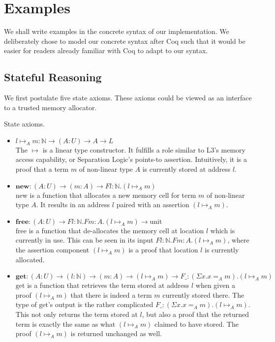 \documentclass[sigplan,screen,review,authordraft]{acmart}
\newcommand{\unit}{\text{unit}}
\newcommand{\new}{\text{new}}
\newcommand{\free}{\text{free}}
\newcommand{\get}{\text{get}}
\begin{document}
\section{Examples}
We shall write examples in the concrete syntax of our implementation. We deliberately chose to model our concrete syntax after Coq such that it would be easier for readers already familiar with Coq to adapt to our syntax.

\subsection{Stateful Reasoning}
We first postulate five state axioms. These axioms could be viewed as an interface to a trusted memory allocator.
\begin{definition}
  State axioms.
  \begin{itemize}
    \item $l \mapsto_A m : \mathbb{N} \rightarrow (A : U) \rightarrow A \rightarrow L$ \\
          The $\mapsto$ is a linear type constructor. It fulfills a role similar to L3's \cite{l3} memory access capability, or Separation Logic's \cite{reynolds02} points-to assertion. Intuitively, it is a proof that a term $m$ of non-linear type $A$ is currently stored at address $l$.
    \item $\textbf{new} : (A : U) \rightarrow (m : A) \rightarrow F l:\mathbb{N}.(l \mapsto_A m)$ \\
          $\new$ is a function that allocates a new memory cell for term $m$ of non-linear type $A$. It results in an address $l$ paired with an assertion $(l \mapsto_A m)$.
    \item $\textbf{free} : (A : U) \rightarrow F l:\mathbb{N}.F m:A.(l \mapsto_A m) \rightarrow \unit$ \\
          $\free$ is a function that de-allocates the memory cell at location $l$ which is currently in use. This can be seen in its input $F l:\mathbb{N}.F m:A.(l \mapsto_A m)$, where the assertion component $(l \mapsto_A m)$ is a proof that location $l$ is currently allocated.
    \item $\textbf{get} : (A : U) \rightarrow (l : \mathbb{N}) \rightarrow (m : A) \rightarrow (l \mapsto_A m) \rightarrow F \_: (\Sigma x. x =_A m). (l \mapsto_A m)$ \\
          $\get$ is a function that retrieves the term stored at address $l$ when given a proof $(l \mapsto_A m)$ that there is indeed a term $m$ currently stored there. The type of $\get$'s output is the rather complicated $F \_: (\Sigma x. x =_A m). (l \mapsto_A m)$. This not only returns the term stored at $l$, but also a proof that the returned term is exactly the same as what $(l \mapsto_A m)$ claimed to have stored. The proof $(l \mapsto_A m)$ is returned unchanged as well.

\end{itemize}
\end{definition}
\end{document}
